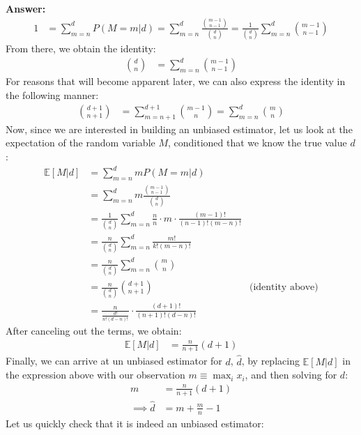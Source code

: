 \documentclass{article}
\newenvironment{QandA}{\begin{enumerate}[label=\arabic*.]}{\end{enumerate}}
\newenvironment{answer}{\par\normalfont \textbf{Answer:}}{}
\newcommand{\Exp}[1]{\mathbb{E}\left[ #1 \right]}
\newcommand{\g}{\vert}
\begin{document}
\begin{QandA}
\begin{answer}
\begin{align*}
            1 &= \sum_{m=n}^d P(M = m \g d) = \sum_{m=n}^d \frac{{ m-1 \choose n-1}}{{ d \choose n }} = \frac{1}{{ d \choose n }} \sum_{m=n}^d { m-1 \choose n-1}
        \end{align*}
        From there, we obtain the identity:
        \begin{align*}
            { d \choose n } &= \sum_{m=n}^d { m-1 \choose n-1} 
        \end{align*}
        For reasons that will become apparent later, we can also express the identity in the following manner:
        \begin{align*}
            { d+1 \choose n+1 } &= \sum_{m=n+1}^{d+1} { m-1 \choose n} = \sum_{m=n}^d {m \choose n }
        \end{align*}
        Now, since we are interested in building an unbiased estimator, let us look at the expectation of the random variable $M$, conditioned that we know the true value $d$:
        \begin{align*}
            \Exp{M \g d} &= \sum_{m=n}^d m P(M = m \g d) \\
            &= \sum_{m=n}^d m \frac{{ m-1 \choose n-1}}{{ d \choose n }} \\
            &= \frac{1}{{ d \choose n }} \sum_{m=n}^d \frac{n}{n} \cdot m \cdot \frac{(m-1)!}{(n-1)!(m-n)!} \\
            &= \frac{n}{{ d \choose n }} \sum_{m=n}^d \frac{m!}{k!(m-n)!} \\
            &= \frac{n}{{ d \choose n }} \sum_{m=n}^d {m \choose n} \\
            &= \frac{n}{{ d \choose n }} {d + 1 \choose n+1} &\text{(identity above)} \\
            &= \frac{n}{\frac{d!}{n!(d-n)!}} \cdot \frac{(d+1)!}{(n+1)!(d-n)!}
        \end{align*}
        After canceling out the terms, we obtain:
        \begin{align*}
            \Exp{M \g d} &= \frac{n}{n+1}(d+1)
        \end{align*} 
        Finally, we can arrive at un unbiased estimator for $d$, $\hat{d}$, by replacing $\Exp{M \g d}$ in the expression above with our observation $m \equiv \max_i x_i$, and then solving for $d$:
        \begin{align*}
            m &= \frac{n}{n+1}(d+1) \\
            \implies \hat{d} &= m + \frac{m}{n} - 1
        \end{align*}
        Let us quickly check that it is indeed an unbiased estimator:

\end{answer}
\end{QandA}
\end{document}
